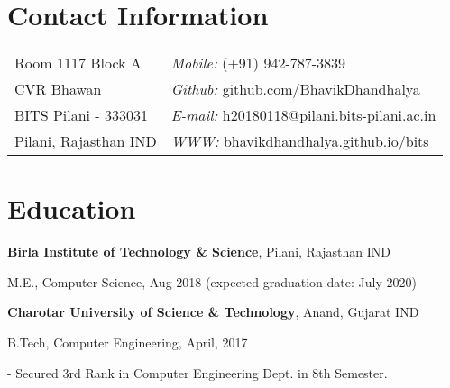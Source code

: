 \documentclass[margin,line]{res}
\newenvironment{list1}{
  \begin{list}{\ding{113}}{%
      \setlength{\itemsep}{0in}
      \setlength{\parsep}{0in} \setlength{\parskip}{0in}
      \setlength{\topsep}{0in} \setlength{\partopsep}{0in} 
      \setlength{\leftmargin}{0.17in}}}{\end{list}}
\begin{document}

\begin{resume}
\section{\sc Contact Information}
\vspace{.05in}
\begin{tabular}{@{}p{2in}p{4in}}
Room 1117 Block A             & {\it Mobile:}  (+91) 942-787-3839 \\            
CVR Bhawan   & {\it Github:}    github.com/BhavikDhandhalya \\         
BITS Pilani - 333031 & {\it E-mail:}  h20180118@pilani.bits-pilani.ac.in\\
Pilani, Rajasthan IND  & {\it WWW:} bhavikdhandhalya.github.io/bits \\     
\end{tabular}



\section{\sc Education}
{\bf Birla Institute of Technology \& Science}, Pilani, Rajasthan IND\\
\vspace*{-.1in}
\begin{list1}
\item[] M.E., Computer Science, Aug 2018 (expected
  graduation date: July 2020)
\vspace*{.05in}
\end{list1}

{\bf Charotar University of Science \& Technology}, Anand, Gujarat IND\\
\vspace*{-.1in}
\begin{list1}
\item[] B.Tech, Computer Engineering,  April, 2017
\item[] - Secured 3rd Rank in Computer Engineering Dept. in 8th Semester.
\end{list1}


\end{resume}
\end{document}
